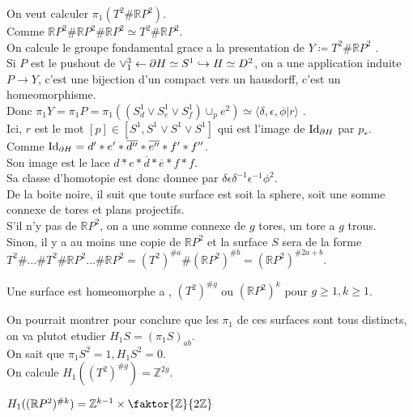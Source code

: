 \documentclass[../main.tex]{subfiles}
\begin{document}
On veut calculer $\pi_1\left( T^{2}\# \mathbb{R}P^{2}\right) $.\\
Comme $ \mathbb{R}P^{2} \# \mathbb{R}P^{2} \# \mathbb{R}P^{2}\simeq T^{2} \# \mathbb{R}P^{2}$.\\
On calcule le groupe fondamental grace a la presentation de $Y \coloneqq T^{2}\# \mathbb{R}P^{2}$ .\\
Si $P$ est le pushout de $ \vee_1^{3} \leftarrow \partial H \simeq S^{1}\hookrightarrow H \simeq D^{2}$, on a une application induite $P\to Y$, c'est une bijection d'un compact vers un hausdorff, c'est un homeomorphisme.\\
Donc $\pi_1 Y = \pi_1 P = \pi_1\left( ( S^{1}_d \vee S^{1}_e\vee S^{1}_f)\cup_p e^{2} \right) \simeq \langle \delta, \epsilon, \phi | r\rangle$ .\\
Ici, $r$ est le mot $[p] \in \left[ S^{1}, S^{1}\vee S^{1}\vee S^{1}\right] $ 	qui est l'image de $\operatorname{Id}_{\partial H} $ par $p_\ast$.\\
Comme $\operatorname{Id}_{\partial H} = d' \ast e' \ast \overline{d''} \ast \overline{e''} \ast f' \ast f''$.\\
Son image est le lace $d\ast e \ast \overline{d} \ast \overline{e} \ast f \ast f $.\\
Sa classe d'homotopie est donc donnee par $\delta \epsilon \delta^{-1}\epsilon^{-1} \phi^{2}$.\\
De la boite noire, il suit que toute surface est soit la sphere, soit une somme connexe de tores et plans projectifs.\\
S'il n'y pas de $ \mathbb{R}P^{2}$, on a une somme connexe de $g$ tores, un tore a $g$ trous.\\
Sinon, il y a au moins une copie de $ \mathbb{R}P^{2}$ et la surface $S$ sera de la forme $ T^{2} \# \ldots \# T^{2} \# \mathbb{R}P^{2} \ldots \# \mathbb{R}P^{2}= ( T^{2})^{\# a} \# ( \mathbb{R}P^{2})^{\# b} = ( \mathbb{R}P^{2})^{\#2a+b}$.
\begin{thm}
	Une surface est homeomorphe a , $ ( T^{2} )^{\# g}$  ou $ ( \mathbb{R}P^{2})^{k}$ pour $g \geq 1, k \geq 1$.
\end{thm}
On pourrait montrer pour conclure que les $\pi_1$ de ces surfaces sont tous distincts, on va plutot etudier  $H_1 S = ( \pi_1S)_{ab} $.\\
On sait que $\pi_1 S^{2} =1 , H_1 S^{2}=0$.\\
On calcule $H_1( ( T^{2}) ^{\# g}) = \mathbb{Z}^{2g}$.
\begin{lemma}
$H_1(  ( \mathbb{R}P^{2})^{\# k}) = \mathbb{Z}^{k-1}\times \faktor { \mathbb{Z}} { 2\mathbb{Z}} $ 
\end{lemma}
\end{document}
